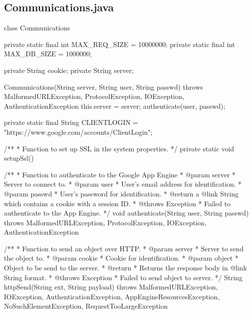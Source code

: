 \subsection{Communications.java}
\begin{code}
class Communications {
	
	private static final int MAX_REQ_SIZE = 10000000;
	private static final int MAX_DB_SIZE  = 1000000;
	
	private String cookie;
	private String server;
	
	Communications(String server, String user, String passwd) 
	  throws MalformedURLException, ProtocolException, IOException, 
	  AuthenticationException {
		this.server = server;
		authenticate(user, passwd);
	}
	
	private static final String CLIENTLOGIN = 
		"https://www.google.com/accounts/ClientLogin";
	
	/**
	 * Function to set up SSL in the system properties. 
	 */
	private static void setupSsl() {
	
	}
	
	/**
	 * Function to authenticate to the Google App Engine
	 * @param server
	 * 				Server to connect to.
	 * @param user
	 * 				User's email address for identification.
	 * @param passwd
	 * 				User's password for identification.
	 * @return a {@link String} which contains a cookie with a session ID.
	 * @throws Exception
	 * 				Failed to authenticate to the App Engine.
	 */
	void authenticate(String user, String passwd) 
	  throws MalformedURLException, ProtocolException, IOException, 
	  AuthenticationException {

	}
	
	/**
	 * Function to send an object over HTTP.
	 * @param server
	 * 				Server to send the object to.
	 * @param cookie
	 * 				Cookie for identification.
	 * @param object
	 * 				Object to be send to the server.
	 * @return
	 * 				Returns the response body in {@link String} format.
	 * @throws Exception
	 * 				Failed to send object to server.
	 */
	String httpSend(String ext, String payload) 
	  throws MalformedURLException, IOException, AuthenticationException,
	  AppEngineResourcesException, NoSuchElementException, 
	  RequestTooLargeException {

	}
}
\end{code}

